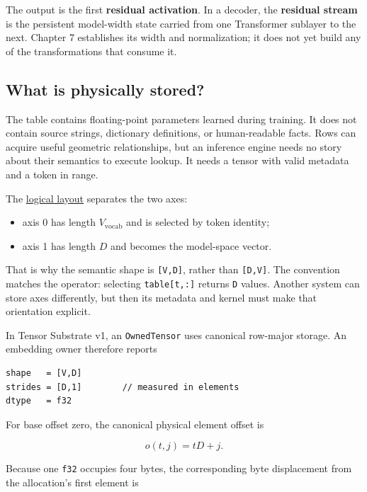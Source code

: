 \documentclass[
  10pt,
]{article}
\providecommand{\tightlist}{%
  \setlength{\itemsep}{0pt}\setlength{\parskip}{0pt}}
\begin{document}
The output is the first \textbf{residual activation}. In a decoder, the
\textbf{residual stream} is the persistent model-width state carried
from one Transformer sublayer to the next. Chapter 7 establishes its
width and normalization; it does not yet build any of the
transformations that consume it.

\subsection{What is physically stored?}\label{what-is-physically-stored}

The table contains floating-point parameters learned during training. It
does not contain source strings, dictionary definitions, or
human-readable facts. Rows can acquire useful geometric relationships,
but an inference engine needs no story about their semantics to execute
lookup. It needs a tensor with valid metadata and a token in range.

The
\href{https://github.com/hermonai/inside-the-llm-engine/blob/astra-visual-rewrite/diagrams/transformer/embedding-logical-layout.txt}{logical
layout} separates the two axes:

\begin{itemize}
\tightlist
\item
  axis 0 has length \(V_{\mathrm{vocab}}\) and is selected by token
  identity;
\item
  axis 1 has length \(D\) and becomes the model-space vector.
\end{itemize}

That is why the semantic shape is \texttt{{[}V,D{]}}, rather than
\texttt{{[}D,V{]}}. The convention matches the operator: selecting
\texttt{table{[}t,:{]}} returns \texttt{D} values. Another system can
store axes differently, but then its metadata and kernel must make that
orientation explicit.

In Tensor Substrate v1, an \texttt{OwnedTensor} uses canonical row-major
storage. An embedding owner therefore reports

\begin{verbatim}
shape   = [V,D]
strides = [D,1]        // measured in elements
dtype   = f32
\end{verbatim}

For base offset zero, the canonical physical element offset is

\[
o(t,j)=tD+j.
\]

Because one \texttt{f32} occupies four bytes, the corresponding byte
displacement from the allocation's first element is
\end{document}
